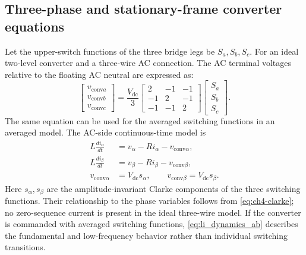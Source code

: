 \subsection{Three-phase and stationary-frame converter equations}
Let the upper-switch functions of the three bridge legs be \(S_a,S_b,S_c\). For an ideal two-level converter and a three-wire AC connection. The AC terminal voltages relative to the floating AC neutral are expressed as:
\begin{equation}\label{eq:li_switching_abc}
\begin{bmatrix}v_{\mathrm{conv}a}\\v_{\mathrm{conv}b}\\v_{\mathrm{conv}c}\end{bmatrix}
=\frac{V_{\mathrm{dc}}}{3}
\begin{bmatrix}
2&-1&-1\\-1&2&-1\\-1&-1&2
\end{bmatrix}
\begin{bmatrix}S_a\\S_b\\S_c\end{bmatrix}.
\end{equation}
The same equation can be used for the averaged switching functions in an averaged model. The AC-side continuous-time model is
\begin{equation}\label{eq:li_dynamics_ab}
\begin{aligned}
L\frac{di_\alpha}{dt}&=v_\alpha-Ri_\alpha-v_{\mathrm{conv}\alpha},\\
L\frac{di_\beta}{dt}&=v_\beta-Ri_\beta-v_{\mathrm{conv}\beta},\\
v_{\mathrm{conv}\alpha}&=V_{\mathrm{dc}}s_\alpha,\qquad
v_{\mathrm{conv}\beta}=V_{\mathrm{dc}}s_\beta .
\end{aligned}
\end{equation}
Here \(s_\alpha,s_\beta\) are the amplitude-invariant Clarke components of the three switching functions. Their relationship to the phase variables follows from \eqref{eq:ch4-clarke}; no zero-sequence current is present in the ideal three-wire model. If the converter is commanded with averaged switching functions, \eqref{eq:li_dynamics_ab} describes the fundamental and low-frequency behavior rather than individual switching transitions.

